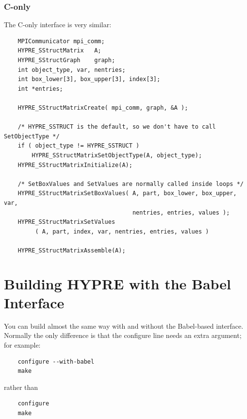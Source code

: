 \subsubsection{C-only}

The C-only interface is very similar:
\begin{verbatim}
    MPICommunicator mpi_comm;
    HYPRE_SStructMatrix   A;
    HYPRE_SStructGraph    graph;
    int object_type, var, nentries;
    int box_lower[3], box_upper[3], index[3];
    int *entries;

    HYPRE_SStructMatrixCreate( mpi_comm, graph, &A );

    /* HYPRE_SSTRUCT is the default, so we don't have to call SetObjectType */
    if ( object_type != HYPRE_SSTRUCT )
        HYPRE_SStructMatrixSetObjectType(A, object_type);
    HYPRE_SStructMatrixInitialize(A);

    /* SetBoxValues and SetValues are normally called inside loops */
    HYPRE_SStructMatrixSetBoxValues( A, part, box_lower, box_upper, var,
                                     nentries, entries, values );
    HYPRE_SStructMatrixSetValues
         ( A, part, index, var, nentries, entries, values )

    HYPRE_SStructMatrixAssemble(A);
\end{verbatim}




\section{Building HYPRE with the Babel Interface}
\label{sec-Building-Babel}

You can build \hypre{} almost the same way with and without the
Babel-based interface.  Normally the only difference is that the
configure line needs an extra argument; for example:

\begin{verbatim}
    configure --with-babel
    make
\end{verbatim}
rather than
\begin{verbatim}
    configure
    make
\end{verbatim}


